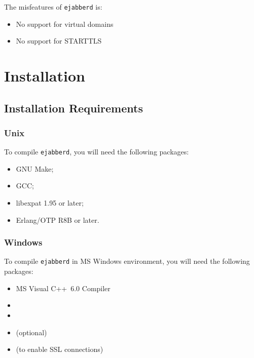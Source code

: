 \documentclass[10pt]{article}
\newcommand{\ejabberd}{\texttt{ejabberd}}
\begin{document}
The misfeatures of \ejabberd{} is:
\begin{itemize}
\item No support for virtual domains
\item No support for STARTTLS
\end{itemize}


\section{Installation}
\label{sec:installation}


\subsection{Installation Requirements}
\label{sec:installreq}

\subsubsection{Unix}
\label{sec:installrequnix}

To compile \ejabberd{}, you will need the following packages:
\begin{itemize}
\item GNU Make;
\item GCC;
\item libexpat 1.95 or later;
\item Erlang/OTP R8B or later.
\end{itemize}

\subsubsection{Windows}
\label{sec:installreqwin}

To compile \ejabberd{} in MS Windows environment, you will need the following
packages:
\begin{itemize}
\item MS Visual C++~6.0 Compiler
\item {}
\item {}
\item
{}
(optional)
\item {}
(to enable SSL connections)
\end{itemize}
\end{document}
